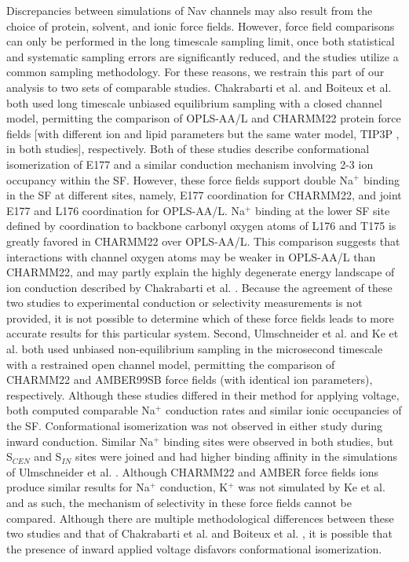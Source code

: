 \begin{refsection}
 Discrepancies between simulations of Nav channels may also result from the choice of protein, solvent, and ionic force fields.  However, force field comparisons can only be performed in the long timescale sampling limit, once both statistical and systematic sampling errors are significantly reduced, and the studies utilize a common sampling methodology.  For these reasons, we restrain this part of our analysis to two sets of comparable studies.  Chakrabarti et al. \cite{Chakrabarti:2013kd} and Boiteux et al. \cite{Boiteux:2014ut} both used long timescale unbiased equilibrium sampling with a closed channel model, permitting the comparison of OPLS-AA/L \cite{Jorgensen:1996vx,Kaminski:2001eq} and CHARMM22 \cite{MacKerell:1998tp,MacKerellJr:2004dv} protein force fields [with different ion and lipid parameters but the same water model, TIP3P \cite{Jorgensen:1983ty}, in both studies], respectively.  Both of these studies describe conformational isomerization of E177 and a similar conduction mechanism involving 2-3 ion occupancy within the SF.  However, these force fields support double Na$^{+}$ binding in the SF at different sites, namely, E177 coordination for CHARMM22, and joint E177 and L176 coordination for OPLS-AA/L.  Na$^{+}$ binding at the lower SF site defined by coordination to backbone carbonyl oxygen atoms of L176 and T175 is greatly favored in CHARMM22 over OPLS-AA/L.  This comparison suggests that interactions with channel oxygen atoms may be weaker in OPLS-AA/L than CHARMM22, and may partly explain the highly degenerate energy landscape of ion conduction described by Chakrabarti et al. \cite{Chakrabarti:2013kd}.  Because the agreement of these two studies to experimental conduction or selectivity measurements is not provided, it is not possible to determine which of these force fields leads to more accurate results for this particular system.  
Second, Ulmschneider et al. \cite{Ulmschneider:2013da} and Ke et al. \cite{Ke:2014fy} both used unbiased non-equilibrium sampling in the microsecond timescale with a restrained open channel model, permitting the comparison of CHARMM22 \cite{MacKerell:1998tp,MacKerellJr:2004dv} and AMBER99SB \cite{Hornak:2006gx} force fields (with identical ion parameters), respectively.  Although these studies differed in their method for applying voltage, both computed comparable Na$^{+}$ conduction rates and similar ionic occupancies of the SF.  Conformational isomerization was not observed in either study during inward conduction. Similar Na$^{+}$ binding sites were observed in both studies, but S$_{CEN}$ and S$_{IN}$ sites were joined and had higher binding affinity in the simulations of Ulmschneider et al. \cite{Ulmschneider:2013da}.  Although CHARMM22 and AMBER force fields ions \cite{Joung:2008bp} produce similar results for Na$^{+}$ conduction, K$^{+}$ was not simulated by Ke et al. \cite{Ke:2014fy} and as such, the mechanism of selectivity in these force fields cannot be compared. Although there are multiple methodological differences between these two studies and that of Chakrabarti et al. \cite{Chakrabarti:2013kd} and Boiteux et al. \cite{Boiteux:2014ut}, it is possible that the presence of inward applied voltage disfavors conformational isomerization.

\end{refsection}
